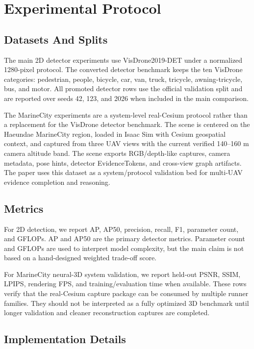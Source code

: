 \section{Experimental Protocol}
\label{sec:experiment_protocol}

\subsection{Datasets And Splits}
\label{sec:datasets}

The main 2D detector experiments use VisDrone2019-DET under a normalized
1280-pixel protocol. The converted detector benchmark keeps the ten VisDrone
categories: pedestrian, people, bicycle, car, van, truck, tricycle,
awning-tricycle, bus, and motor. All promoted detector rows use the official
validation split and are reported over seeds 42, 123, and 2026 when included in
the main comparison.

The MarineCity experiments are a system-level real-Cesium protocol rather than
a replacement for the VisDrone detector benchmark. The scene is centered on the
Haeundae MarineCity region, loaded in Isaac Sim with Cesium geospatial context,
and captured from three UAV views with the current verified 140--160 m camera
altitude band. The scene exports RGB/depth-like captures, camera metadata,
pose hints, detector EvidenceTokens, and cross-view graph artifacts. The paper
uses this dataset as a system/protocol validation bed for multi-UAV evidence
completion and reasoning.

\subsection{Metrics}
\label{sec:metrics}

For 2D detection, we report AP, AP50, precision, recall, F1, parameter count,
and GFLOPs. AP and AP50 are the primary detector metrics. Parameter count and
GFLOPs are used to interpret model complexity, but the main claim is not based
on a hand-designed weighted trade-off score.

For MarineCity neural-3D system validation, we report held-out PSNR, SSIM,
LPIPS, rendering FPS, and training/evaluation time when available. These rows
verify that the real-Cesium capture package can be consumed by multiple
runner families. They should not be interpreted as a fully optimized 3D
benchmark until longer validation and cleaner reconstruction captures are
completed.

\subsection{Implementation Details}
\label{sec:implementation_details}

